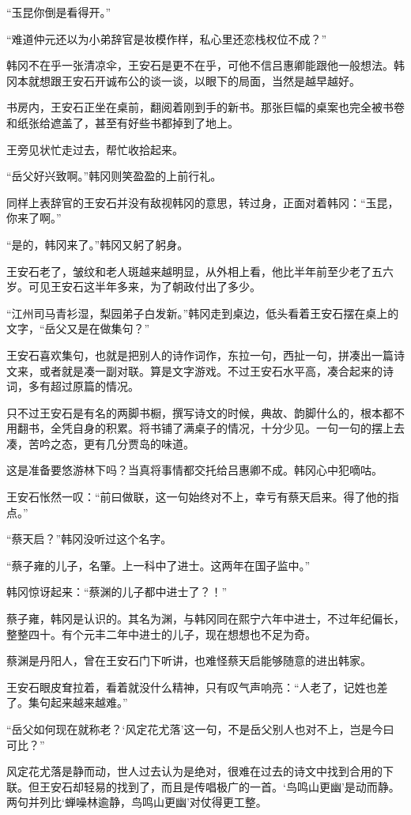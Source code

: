 “玉昆你倒是看得开。”

“难道仲元还以为小弟辞官是妆模作样，私心里还恋栈权位不成？”

韩冈不在乎一张清凉伞，王安石是更不在乎，可他不信吕惠卿能跟他一般想法。韩冈本就想跟王安石开诚布公的谈一谈，以眼下的局面，当然是越早越好。

书房内，王安石正坐在桌前，翻阅着刚到手的新书。那张巨幅的桌案也完全被书卷和纸张给遮盖了，甚至有好些书都掉到了地上。

王旁见状忙走过去，帮忙收拾起来。

“岳父好兴致啊。”韩冈则笑盈盈的上前行礼。

同样上表辞官的王安石并没有敌视韩冈的意思，转过身，正面对着韩冈：“玉昆，你来了啊。”

“是的，韩冈来了。”韩冈又躬了躬身。

王安石老了，皱纹和老人斑越来越明显，从外相上看，他比半年前至少老了五六岁。可见王安石这半年多来，为了朝政付出了多少。

“江州司马青衫湿，梨园弟子白发新。”韩冈走到桌边，低头看着王安石摆在桌上的文字，“岳父又是在做集句？”

王安石喜欢集句，也就是把别人的诗作词作，东拉一句，西扯一句，拼凑出一篇诗文来，或者就是凑一副对联。算是文字游戏。不过王安石水平高，凑合起来的诗词，多有超过原篇的情况。

只不过王安石是有名的两脚书橱，撰写诗文的时候，典故、韵脚什么的，根本都不用翻书，全凭自身的积累。将书铺了满桌子的情况，十分少见。一句一句的摆上去凑，苦吟之态，更有几分贾岛的味道。

这是准备要悠游林下吗？当真将事情都交托给吕惠卿不成。韩冈心中犯嘀咕。

王安石怅然一叹：“前曰做联，这一句始终对不上，幸亏有蔡天启来。得了他的指点。”

“蔡天启？”韩冈没听过这个名字。

“蔡子雍的儿子，名肇。上一科中了进士。这两年在国子监中。”

韩冈惊讶起来：“蔡渊的儿子都中进士了？！”

蔡子雍，韩冈是认识的。其名为渊，与韩冈同在熙宁六年中进士，不过年纪偏长，整整四十。有个元丰二年中进士的儿子，现在想想也不足为奇。

蔡渊是丹阳人，曾在王安石门下听讲，也难怪蔡天启能够随意的进出韩家。

王安石眼皮耷拉着，看着就没什么精神，只有叹气声响亮：“人老了，记姓也差了。集句起来越来越难。”

“岳父如何现在就称老？‘风定花尤落’这一句，不是岳父别人也对不上，岂是今曰可比？”

风定花尤落是静而动，世人过去认为是绝对，很难在过去的诗文中找到合用的下联。但王安石却轻易的找到了，而且是传唱极广的一首。‘鸟鸣山更幽’是动而静。两句并列比‘蝉噪林逾静，鸟鸣山更幽’对仗得更工整。

